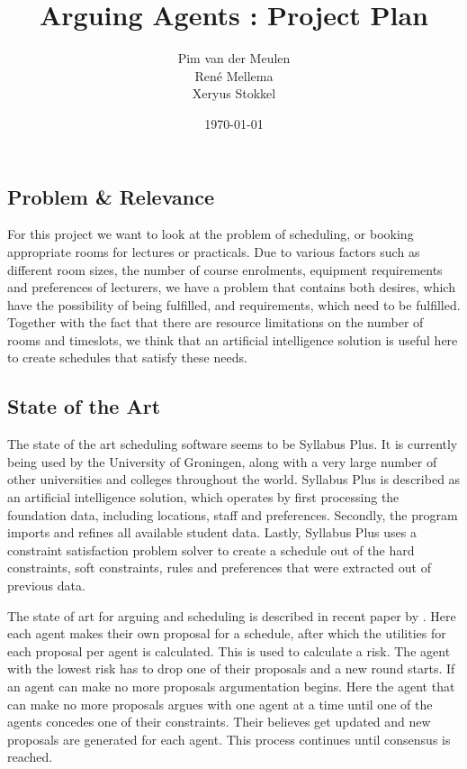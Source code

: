 \documentclass[a4paper]{article}
\title{\textsf{Arguing Agents :} Project Plan}
\author{Pim van der Meulen \\Ren\'e Mellema \\Xeryus Stokkel}
\date{\today}
\begin{document}
\maketitle

\subsection*{Problem \& Relevance}
For this project we want to look at the problem of scheduling, or booking appropriate rooms for lectures or practicals. Due to various factors such as different room sizes, the number of course enrolments, equipment requirements and preferences of lecturers, we have a problem that contains both desires, which have the possibility of being fulfilled, and requirements, which need to be fulfilled. Together with the fact that there are resource limitations on the number of rooms and timeslots, we think that an artificial intelligence solution is useful here to create schedules that satisfy these needs.      
 
\subsection*{State of the Art}
The state of the art scheduling software seems to be Syllabus Plus. It is currently being used by the University of Groningen, along with a very large number of other universities and colleges throughout the world. Syllabus Plus is described as an artificial intelligence solution, which operates by first processing the foundation data, including locations, staff and preferences. Secondly, the program imports and refines all available student data. Lastly, Syllabus Plus uses a constraint satisfaction problem solver to create a schedule out of the hard constraints, soft constraints, rules and preferences that were extracted out of previous data. 

The state of art for arguing and scheduling is described in recent paper by \cite{kuo2011multi}. Here each agent makes their own proposal for a schedule, after which the utilities for each proposal per agent is calculated. This is used to calculate a risk. The agent with the lowest risk has to drop one of their proposals and a new round starts. If an agent can make no more proposals argumentation begins. Here the agent that can make no more proposals argues with one agent at a time until one of the agents concedes one of their constraints. Their believes get updated and new proposals are generated for each agent. This process continues until consensus is reached.  
\end{document}
